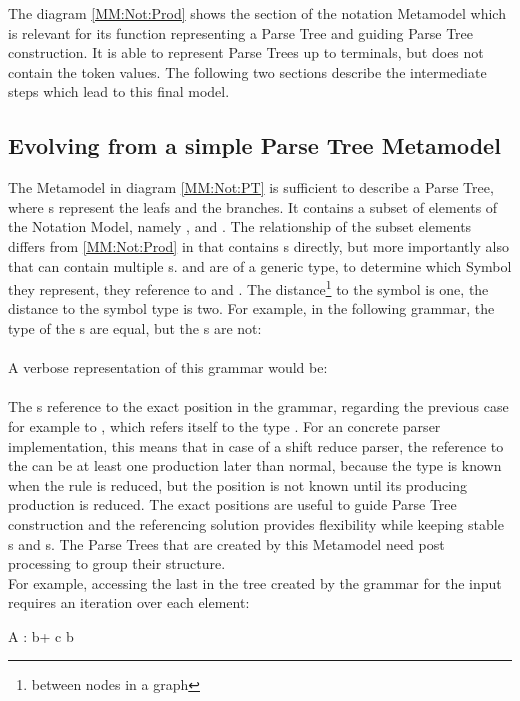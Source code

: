 The diagram \ref{MM:Not:Prod} shows the section of the notation Metamodel which is relevant for its function representing a Parse Tree and guiding Parse Tree construction. It is able to represent Parse Trees up to terminals, but does not contain the token values. The following two sections describe the intermediate steps which lead to this final model.\\


\subsection{Evolving from a simple Parse Tree Metamodel} The Metamodel in diagram \ref{MM:Not:PT} is sufficient to describe a Parse Tree, where s represent the leafs and  the branches. It contains a subset of elements of the Notation Model, namely ,  and . The relationship of the subset elements differs from \ref{MM:Not:Prod} in that  contains s directly, but more importantly also that  can contain multiple s.  and  are of a generic type, to determine which Symbol they represent, they reference to  and . The distance\footnote{\raggedright between nodes in a graph} to the symbol is one, the distance to the symbol type is two. 
For example, in the following grammar, the type of the s are equal, but the s are not:\\
 \\
A verbose representation of this grammar would be: \\
 \\
The s reference to the exact position in the grammar, regarding the previous case for example to , which refers itself to the type . For an concrete parser implementation, this means that in case of a shift reduce parser, the reference to the  can be at least one production later than normal, because the type is known when the rule is reduced, but the position is not known until its producing production is reduced. The exact positions are useful to guide Parse Tree construction and the referencing solution provides flexibility while keeping stable s and s. The Parse Trees that are created by this Metamodel need post processing to group their structure. \\
For example, accessing the last  in the tree created by the grammar for the input  requires an iteration over each element:\\
\begin{xtxt}
A : b+ c b 
\end{xtxt}


